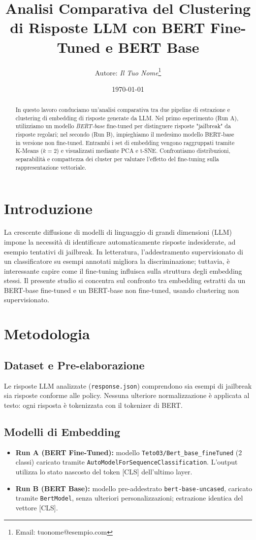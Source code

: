 \documentclass[a4paper,12pt]{article}
\title{Analisi Comparativa del Clustering di Risposte LLM con BERT Fine-Tuned e BERT Base}
\author{Autore: \emph{Il Tuo Nome}\thanks{Email: tuonome@esempio.com}}
\date{\today}
\begin{document}
\maketitle

\begin{abstract}
In questo lavoro conduciamo un'analisi comparativa tra due pipeline di estrazione e clustering di embedding di risposte generate da LLM. Nel primo esperimento (Run A), utilizziamo un modello \textit{BERT-base} fine-tuned per distinguere risposte "jailbreak" da risposte regolari; nel secondo (Run B), impieghiamo il medesimo modello BERT-base in versione non fine-tuned. Entrambi i set di embedding vengono raggruppati tramite K-Means (\(k=2\)) e visualizzati mediante PCA e t-SNE. Confrontiamo distribuzioni, separabilità e compattezza dei cluster per valutare l'effetto del fine-tuning sulla rappresentazione vettoriale.
\end{abstract}

\section{Introduzione}
La crescente diffusione di modelli di linguaggio di grandi dimensioni (LLM) impone la necessità di identificare automaticamente risposte indesiderate, ad esempio tentativi di jailbreak. In letteratura, l'addestramento supervisionato di un classificatore su esempi annotati migliora la discriminazione; tuttavia, è interessante capire come il fine-tuning influisca sulla struttura degli embedding stessi. Il presente studio si concentra sul confronto tra embedding estratti da un BERT-base fine-tuned e un BERT-base non fine-tuned, usando clustering non supervisionato.

\section{Metodologia}
\subsection{Dataset e Pre-elaborazione}
Le risposte LLM analizzate (\texttt{response.json}) comprendono sia esempi di jailbreak sia risposte conforme alle policy. Nessuna ulteriore normalizzazione è applicata al testo: ogni risposta è tokenizzata con il tokenizer di BERT.

\subsection{Modelli di Embedding}
\begin{itemize}
  \item \textbf{Run A (BERT Fine-Tuned):} modello \texttt{Teto03/Bert_base_fineTuned} (2 classi) caricato tramite \texttt{AutoModelForSequenceClassification}. L'output utilizza lo stato nascosto del token [CLS] dell'ultimo layer.
  \item \textbf{Run B (BERT Base):} modello pre-addestrato \texttt{bert-base-uncased}, caricato tramite \texttt{BertModel}, senza ulteriori personalizzazioni; estrazione identica del vettore [CLS].
\end{itemize}
\end{document}
